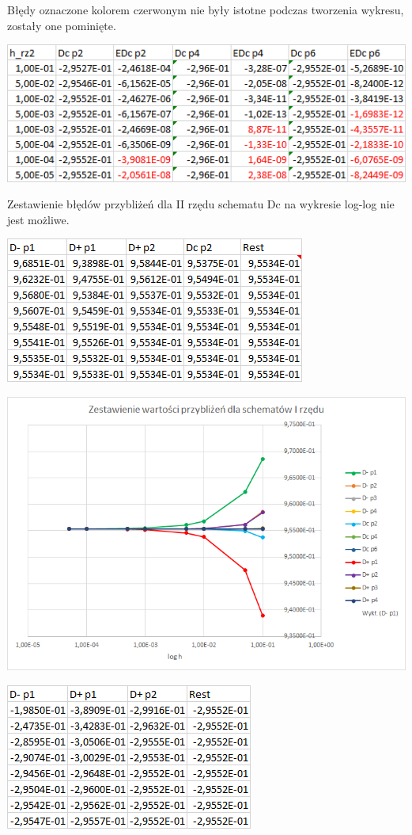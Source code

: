 Błędy oznaczone kolorem czerwonym nie były istotne podczas tworzenia wykresu, zostały one pominięte.

\includegraphics{Lab2/charts/rz2_log_Dc_dane.png}

Zestawienie błędów przybliżeń dla II rzędu schematu Dc na wykresie log-log nie jest możliwe. 

\includegraphics{Lab2/charts/rz1_log_e_dane.png}

\includegraphics{Lab2/charts/rz1_log_e.png}
\newpage


\includegraphics{Lab2/charts/rz2_log_e_dane.png}

